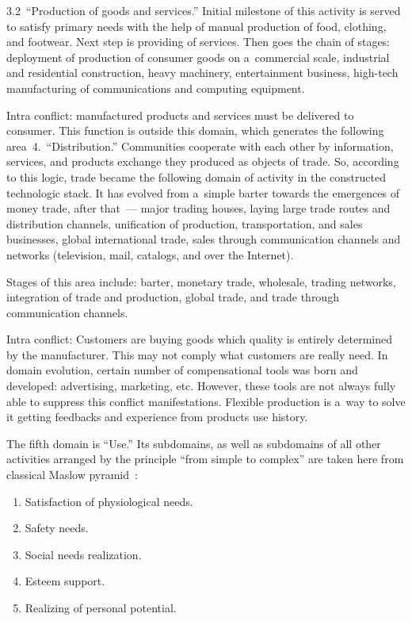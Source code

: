 \begin{multicols}{2}
 3.2\ ``Production of goods and services.'' Initial milestone of this activity
 is served to satisfy primary needs
with the help of manual production of food, clothing, and footwear.
Next step is providing of services. Then
goes the chain of stages: deployment of production of consumer goods on a~commercial scale, industrial and
residential construction, heavy machinery, entertainment business, high-tech manufacturing of
communications and computing equipment.

 Intra conflict: manufactured products and services must be delivered to consumer. This function is outside
this domain, which generates the following
area~4.~``Distribution.'' Communities cooperate with each other
by information, services, and products exchange they produced as objects of trade.
So, according to this logic,
trade became the following domain of activity in
the constructed technologic stack. It has evolved from
a~simple barter towards the emergences of money trade, after that~--- major trading houses, laying large
trade routes and distribution channels, unification of production,
transportation, and sales businesses, global
international trade, sales through communication channels and networks (television, mail, catalogs, and
over the Internet).

 Stages of this area include: barter, monetary trade, wholesale, trading networks, integration of trade and
production, global trade, and trade through communication channels.

 Intra conflict: Customers are buying goods which quality is entirely determined by the manufacturer. This
may not comply what customers are really need. In domain evolution, certain number of compensational
tools was born and developed: advertising, marketing, etc. However, these tools are not always fully able to
suppress this conflict manifestations. Flexible production is a~way to solve it getting feedbacks and
experience from products use history.

The fifth domain is ``Use.'' Its subdomains, as well as subdomains of all other activities arranged by the
principle ``from simple to complex'' are taken here from  classical
Maslow pyramid~\cite{2-sor}:
 \begin{enumerate}[{5.}1]
 \item  Satisfaction of physiological needs.
 \item Safety needs.
 \item Social needs realization.
 \item Esteem support.
 \item Realizing of personal potential.
 \end{enumerate}


\end{multicols}
